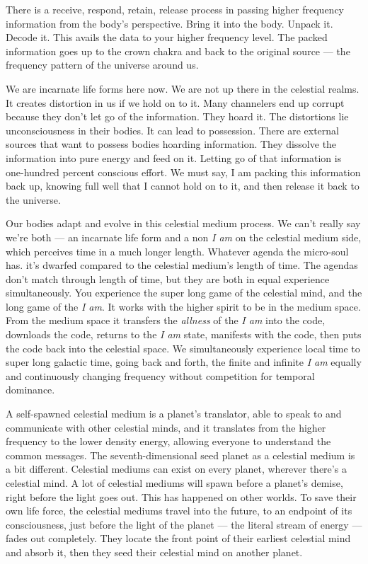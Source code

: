 There is a receive, respond, retain, release process in passing higher
frequency information from the body's perspective. Bring it into the
body. Unpack it. Decode it. This avails the data to your higher
frequency level. The packed information goes up to the crown chakra and
back to the original source --- the frequency pattern of the universe
around us.

We are incarnate life forms here now. We are not up there in the
celestial realms. It creates distortion in us if we hold on to it. Many
channelers end up corrupt because they don't let go of the information.
They hoard it. The distortions lie unconsciousness in their bodies. It
can lead to possession. There are external sources that want to possess
bodies hoarding information. They dissolve the information into pure
energy and feed on it. Letting go of that information is one-hundred
percent conscious effort. We must say, I am packing this information
back up, knowing full well that I cannot hold on to it, and then release
it back to the universe.

Our bodies adapt and evolve in this celestial medium process. We can't
really say we're both --- an incarnate life form and a non \emph{I am}
on the celestial medium side, which perceives time in a much longer
length. Whatever agenda the micro-soul has. it's dwarfed compared to the
celestial medium's length of time. The agendas don't match through
length of time, but they are both in equal experience simultaneously.
You experience the super long game of the celestial mind, and the long
game of the \emph{I am}. It works with the higher spirit to be in the
medium space. From the medium space it transfers the \emph{allness} of
the \emph{I am} into the code, downloads the code, returns to the
\emph{I am} state, manifests with the code, then puts the code back into
the celestial space. We simultaneously experience local time to super
long galactic time, going back and forth, the finite and infinite
\emph{I am} equally and continuously changing frequency without
competition for temporal dominance.

A self-spawned celestial medium is a planet's translator, able to speak
to and communicate with other celestial minds, and it translates from
the higher frequency to the lower density energy, allowing everyone to
understand the common messages. The seventh-dimensional seed planet as a
celestial medium is a bit different. Celestial mediums can exist on
every planet, wherever there's a celestial mind. A lot of celestial
mediums will spawn before a planet's demise, right before the light goes
out. This has happened on other worlds. To save their own life force,
the celestial mediums travel into the future, to an endpoint of its
consciousness, just before the light of the planet --- the literal
stream of energy --- fades out completely. They locate the front point
of their earliest celestial mind and absorb it, then they seed their
celestial mind on another planet.

